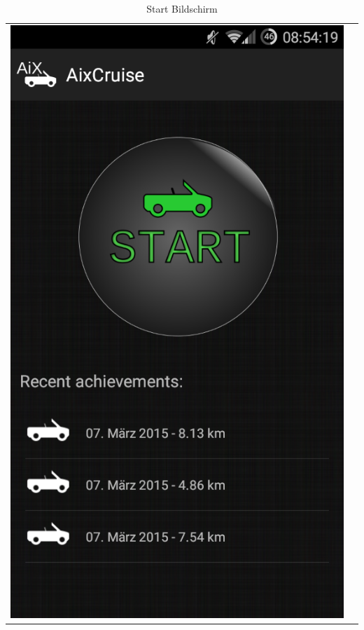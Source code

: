 \documentclass[12pt,a4paper,bibliography=totocnumbered,listof=totocnumbered]{scrartcl}
\begin{document}
\begin{table}
\begin{tabular}{c c}

\begin{minipage}{.5\textwidth}
  \centering
  \includegraphics[scale=0.3]{images/main.png}
  \caption{Start Bildschirm}
  \label{main}
\end{minipage}
&
\begin{minipage}{.5\textwidth}
  \centering

\end{minipage}
\end{tabular}
\end{table}
\end{document}

